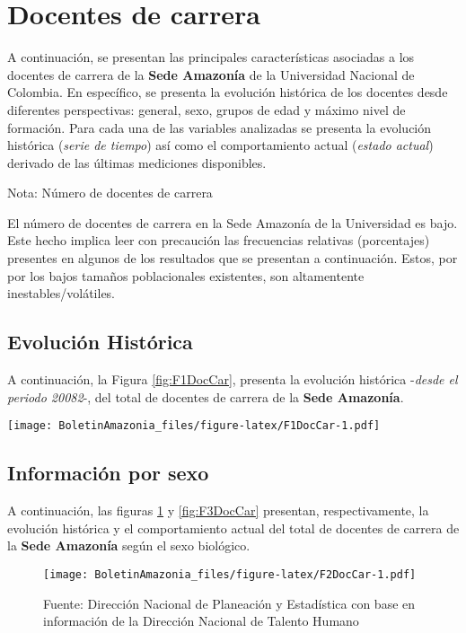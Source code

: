 \documentclass[
]{book}
\begin{document}
\hypertarget{DocCar}{%
\section{Docentes de carrera}\label{DocCar}}

A continuación, se presentan las principales características asociadas a los docentes de carrera de la \textbf{Sede Amazonía} de la Universidad Nacional de Colombia. En específico, se presenta la evolución histórica de los docentes desde diferentes perspectivas: general, sexo, grupos de edad y máximo nivel de formación. Para cada una de las variables analizadas se presenta la evolución histórica (\emph{serie de tiempo}) así como el comportamiento actual (\emph{estado actual}) derivado de las últimas mediciones disponibles.

Nota: Número de docentes de carrera

El número de docentes de carrera en la Sede Amazonía de la Universidad es bajo. Este hecho implica leer con precaución las frecuencias relativas (porcentajes) presentes en algunos de los resultados que se presentan a continuación. Estos, por por los bajos tamaños poblacionales existentes, son altamentente inestables/volátiles.

\hypertarget{evoluciuxf3n-histuxf3rica-10}{%
\subsection{Evolución Histórica}\label{evoluciuxf3n-histuxf3rica-10}}

A continuación, la Figura \ref{fig:F1DocCar}, presenta la evolución histórica -\emph{desde el periodo 20082}-, del total de docentes de carrera de la \textbf{Sede Amazonía}.

\texttt{[image: BoletinAmazonia\_files/figure-latex/F1DocCar-1.pdf]}

\hypertarget{informaciuxf3n-por-sexo-10}{%
\subsection{Información por sexo}\label{informaciuxf3n-por-sexo-10}}

A continuación, las figuras \ref{fig:F2DocCar} y \ref{fig:F3DocCar} presentan, respectivamente, la evolución histórica y el comportamiento actual del total de docentes de carrera de la \textbf{Sede Amazonía} según el sexo biológico.

\begin{figure}
\centering
\texttt{[image: BoletinAmazonia\_files/figure-latex/F2DocCar-1.pdf]}
\caption{\label{fig:F2DocCar}Fuente: Dirección Nacional de Planeación y Estadística con base en información de la Dirección Nacional de Talento Humano}
\end{figure}
\end{document}
